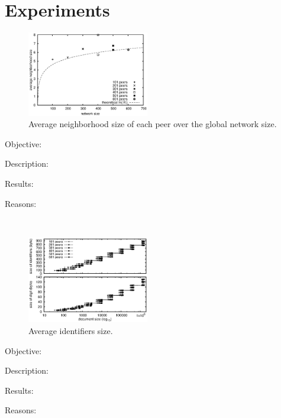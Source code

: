\section{Experiments}
\label{sec:experiments}

\begin{figure}
  \centering
  \includegraphics[width=0.475\textwidth]{./img/partialview.eps}
  \caption{\label{fig:partialview} Average neighborhood size of each peer over
  the global network size.}
\end{figure}

\begin{asparadesc}
\item [Objective:]
\item [Description:]
\item [Results:]
\item [Reasons:]
\end{asparadesc}

\ \\

\begin{figure}
  \centering
  \includegraphics[width=0.475\textwidth]{./img/identifiers.eps}
  \caption{\label{fig:identifiers} Average identifiers size.}
\end{figure}

\begin{asparadesc}
\item [Objective:]
\item [Description:]
\item [Results:]
\item [Reasons:]
\end{asparadesc}

